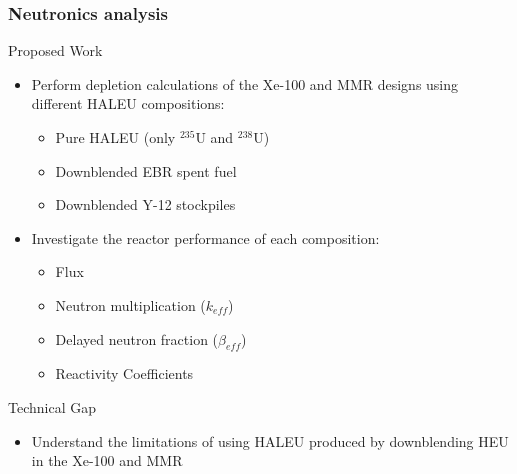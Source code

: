 \begin{frame}
        \frametitle{Neutronics analysis}
        \begin{block}{Proposed Work}
                \begin{itemize}
                \item Perform depletion calculations of the Xe-100 and \gls{MMR} 
                        designs using different \gls{HALEU} compositions:
                        \begin{itemize}
                                \item Pure \gls{HALEU} (only $^{235}$U and $^{238}$U)
                                \item Downblended \gls{EBR} spent fuel
                                \item Downblended Y-12 stockpiles
                        \end{itemize}
                \item Investigate the reactor performance of each composition:
                        \begin{itemize}
                                \item Flux
                                \item Neutron multiplication ($k_{eff}$)
                                \item Delayed neutron fraction ($\beta_{eff}$)
                                \item Reactivity Coefficients
                        \end{itemize}
                \end{itemize}
        \end{block}
        \begin{block}{Technical Gap}
                \begin{itemize}
                        \item Understand the limitations 
                                of using \gls{HALEU} produced by downblending 
                                \gls{HEU} in the Xe-100 and MMR
                \end{itemize}
        \end{block}
\end{frame}
